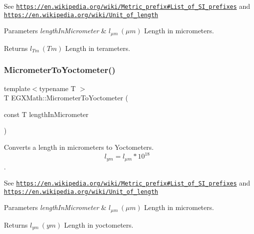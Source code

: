 See \href{https://en.wikipedia.org/wiki/Metric_prefix#List_of_SI_prefixes}{\tt https\+://en.\+wikipedia.\+org/wiki/\+Metric\+\_\+prefix\#\+List\+\_\+of\+\_\+\+S\+I\+\_\+prefixes} and \href{https://en.wikipedia.org/wiki/Unit_of_length}{\tt https\+://en.\+wikipedia.\+org/wiki/\+Unit\+\_\+of\+\_\+length} 
\begin{DoxyParams}{Parameters}
{\em length\+In\+Micrometer} & $ l_{\mu m}\ (\mu m)$ Length in micrometers. \\
\hline
\end{DoxyParams}
\begin{DoxyReturn}{Returns}
$ l_{Tm}\ (Tm)$ Length in terameters. 
\end{DoxyReturn}
\mbox{\label{group___e_g_x_math-_conversions-_length_conversions-_micrometer-_s_i_ga58e346f8863d6679fecc09c55e253116}} 
\subsubsection{\texorpdfstring{Micrometer\+To\+Yoctometer()}{MicrometerToYoctometer()}}
{\footnotesize\ttfamily template$<$typename T $>$ \\
T E\+G\+X\+Math\+::\+Micrometer\+To\+Yoctometer (\begin{DoxyParamCaption}\item[{const T}]{length\+In\+Micrometer }\end{DoxyParamCaption})}



Converts a length in micrometers to Yoctometers. \[ l_{ym}=l_{\mu m} * 10^{18} \]. 

See \href{https://en.wikipedia.org/wiki/Metric_prefix#List_of_SI_prefixes}{\tt https\+://en.\+wikipedia.\+org/wiki/\+Metric\+\_\+prefix\#\+List\+\_\+of\+\_\+\+S\+I\+\_\+prefixes} and \href{https://en.wikipedia.org/wiki/Unit_of_length}{\tt https\+://en.\+wikipedia.\+org/wiki/\+Unit\+\_\+of\+\_\+length} 
\begin{DoxyParams}{Parameters}
{\em length\+In\+Micrometer} & $ l_{\mu m}\ (\mu m)$ Length in micrometers. \\
\hline
\end{DoxyParams}
\begin{DoxyReturn}{Returns}
$ l_{ym}\ (ym)$ Length in yoctometers. 
\end{DoxyReturn}
\mbox{\label{group___e_g_x_math-_conversions-_length_conversions-_micrometer-_s_i_gaeea13656a8abffb34144175cba3b9afc}} 
